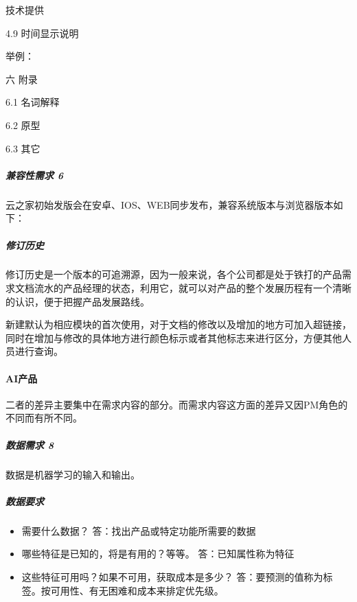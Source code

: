 \documentclass[letterpaper,10pt,english]{sphinxmanual}
\begin{document}
技术提供

4.9 时间显示说明

举例：

六 附录

6.1 名词解释

6.2 原型

6.3 其它


\subparagraph{兼容性需求 6\sphinxfootnotemark[569]}
\label{\detokenize{chapter_knowledge/PRD:id19}}%
\begin{footnotetext}[569]\sphinxAtStartFootnote
{}
%
\end{footnotetext}\ignorespaces 
云之家初始发版会在安卓、IOS、WEB同步发布，兼容系统版本与浏览器版本如下：


\subparagraph{修订历史}
\label{\detokenize{chapter_knowledge/PRD:id20}}
修订历史是一个版本的可追溯源，因为一般来说，各个公司都是处于铁打的产品需求文档流水的产品经理的状态，利用它，就可以对产品的整个发展历程有一个清晰的认识，便于把握产品发展路线。

新建默认为相应模块的首次使用，对于文档的修改以及增加的地方可加入超链接，同时在增加与修改的具体地方进行颜色标示或者其他标志来进行区分，方便其他人员进行查询。


\paragraph{AI产品}
\label{\detokenize{chapter_knowledge/PRD:ai}}
二者的差异主要集中在需求内容的部分。而需求内容这方面的差异又因PM角色的不同而有所不同。



\subparagraph{数据需求 8\sphinxfootnotemark[570]}
\label{\detokenize{chapter_knowledge/PRD:id21}}%
\begin{footnotetext}[570]\sphinxAtStartFootnote
{}
%
\end{footnotetext}\ignorespaces 
数据是机器学习的输入和输出。


\subparagraph{数据要求}
\label{\detokenize{chapter_knowledge/PRD:id22}}\begin{itemize}
\item {} 
需要什么数据？ 答：找出产品或特定功能所需要的数据

\item {} 
哪些特征是已知的，将是有用的？等等。 答：已知属性称为特征

\item {} 
这些特征可用吗？如果不可用，获取成本是多少？
答：要预测的值称为标签。按可用性、有无困难和成本来排定优先级。

\end{itemize}
\end{document}
